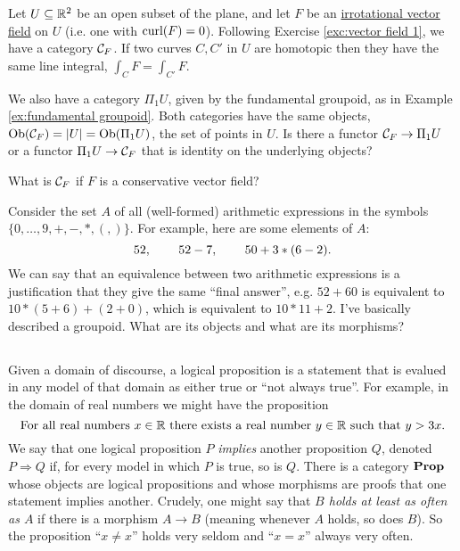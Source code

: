 \begin{exercise}
Let $U\subseteq{\mathbb R}^2$ be an open subset of the plane, and let $F$ be an \href{http://en.wikipedia.org/wiki/Conservative_vector_field#Irrotational_vector_fields}{\text irrotational vector field} on $U$ (i.e. one with $\textnormal{curl}(F)=0$). Following Exercise \ref{exc:vector field 1}, we have a category $\mathcal{C}_F$. If two curves $C,C'$ in $U$ are homotopic then they have the same line integral, $\int_CF=\int_{C'}F$.

We also have a category $\Pi_1U$, given by the fundamental groupoid, as in Example \ref{ex:fundamental groupoid}. Both categories have the same objects, $\textnormal{Ob}(\mathcal{C}_F)=|U|=\textnormal{Ob}(\Pi_1U)$, the set of points in $U$.
\sexc Is there a functor $\mathcal{C}_F\rightarrow\Pi_1U$ or a functor $\Pi_1U\rightarrow\mathcal{C}_F$ that is identity on the underlying objects? 
\item What is $\mathcal{C}_F$ if $F$ is a conservative vector field?
\endsexc
\end{exercise}

\begin{exercise}
Consider the set $A$ of all (well-formed) arithmetic expressions in the symbols $\{0,\ldots,9,+,-,*,(,)\}$. For example, here are some elements of $A$: $$52,\hspace{.3in} 52-7,\hspace{.3in} 50+3*(6-2).$$ We can say that an equivalence between two arithmetic expressions is a justification that they give the same “final answer”, e.g. $52+60$ is equivalent to $10*(5+6)+(2+0)$, which is equivalent to $10*11+2$. I've basically described a groupoid. What are its objects and what are its morphisms?
\end{exercise}


\subsection{}


\subsubsection{}\label{sec:propositions}

Given a domain of discourse, a logical proposition is a statement that is evalued in any model of that domain as either true or “not always true”. For example, in the domain of real numbers we might have the proposition 
$$\textnormal{For all real numbers }x\in{\mathbb R}\textnormal{ there exists a real number } y\in{\mathbb R}\textnormal{ such that }y>3x.$$
We say that one logical proposition $P$ {\em implies} another proposition $Q$, denoted $P\Rightarrow Q$ if, for every model in which $P$ is true, so is $Q$. There is a category ${\bf Prop}$ whose objects are logical propositions and whose morphisms are proofs that one statement implies another. Crudely, one might say that {\em $B$ holds at least as often as $A$} if there is a morphism $A\to B$ (meaning whenever $A$ holds, so does $B$). So the proposition “$x\neq x$” holds very seldom and “$x=x$” always very often.

